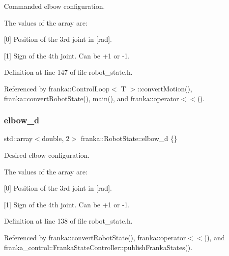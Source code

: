 Commanded elbow configuration.

The values of the array are\+:
\begin{DoxyItemize}
\item \mbox{[}0\mbox{]} Position of the 3rd joint in \mbox{[}rad\mbox{]}.
\item \mbox{[}1\mbox{]} Sign of the 4th joint. Can be +1 or -\/1. 
\end{DoxyItemize}

Definition at line 147 of file robot\+\_\+state.\+h.



Referenced by franka\+::\+Control\+Loop$<$ T $>$\+::convert\+Motion(), franka\+::convert\+Robot\+State(), main(), and franka\+::operator$<$$<$().

\mbox{\label{structfranka_1_1RobotState_a295dada05d8588fc3c19a74fd427dcc0}} 
\subsubsection{\texorpdfstring{elbow\+\_\+d}{elbow\_d}}
{\footnotesize\ttfamily std\+::array$<$double, 2$>$ franka\+::\+Robot\+State\+::elbow\+\_\+d \{\}}

Desired elbow configuration.

The values of the array are\+:
\begin{DoxyItemize}
\item \mbox{[}0\mbox{]} Position of the 3rd joint in \mbox{[}rad\mbox{]}.
\item \mbox{[}1\mbox{]} Sign of the 4th joint. Can be +1 or -\/1. 
\end{DoxyItemize}

Definition at line 138 of file robot\+\_\+state.\+h.



Referenced by franka\+::convert\+Robot\+State(), franka\+::operator$<$$<$(), and franka\+\_\+control\+::\+Franka\+State\+Controller\+::publish\+Franka\+States().

\mbox{\label{structfranka_1_1RobotState_a705b85049fef747008b0eba8284c8057}} 
